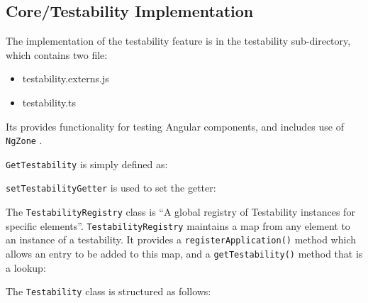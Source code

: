 \subsection{Core/Testability Implementation}

The implementation of the testability feature is in the testability sub-directory, which
contains two file:

\begin{itemize}
  \item testability.externs.js
  \item testability.ts
\end{itemize}

Its provides functionality for testing Angular components, and includes use of
\texttt{NgZone}
.

\texttt{GetTestability}
is simply defined as:



\texttt{setTestabilityGetter}
is used to set the getter:



The
\texttt{TestabilityRegistry}
class is “A global registry of Testability instances for
specific elements”.
\texttt{TestabilityRegistry}
maintains a map from any element to an
instance of a testability. It provides a
\texttt{registerApplication()}
method which allows
an entry to be added to this map, and a
\texttt{getTestability()}
method that is a lookup:



The
\texttt{Testability}
class is structured as follows:


